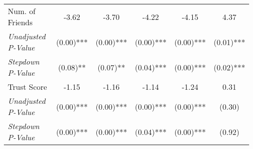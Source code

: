 \begin{tabular}{l c c c c c}
Num. of Friends & -3.62 & -3.70 & -4.22 & -4.15 & 4.37 \\
\quad \textit{Unadjusted P-Value} & (0.00)*** & (0.00)*** & (0.00)*** & (0.00)*** & (0.01)*** \\
\quad \textit{Stepdown P-Value} & (0.08)** & (0.07)** & (0.04)*** & (0.00)*** & (0.02)*** \\
Trust Score & -1.15 & -1.16 & -1.14 & -1.24 & 0.31 \\
\quad \textit{Unadjusted P-Value} & (0.00)*** & (0.00)*** & (0.00)*** & (0.00)*** & (0.30) \\
\quad \textit{Stepdown P-Value} & (0.00)*** & (0.00)*** & (0.04)*** & (0.00)*** & (0.92) \\
\bottomrule
\end{tabular}
